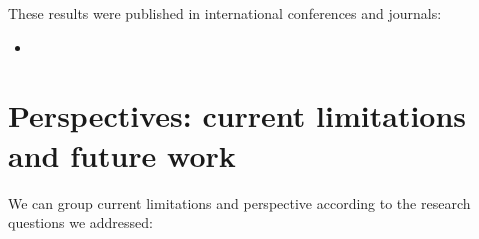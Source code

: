 
These results were published in international conferences and journals:

\begin{itemize}
\item{}
\end{itemize}


\section{Perspectives: current limitations and future work}

We can group current limitations and perspective according to the research questions we addressed:
